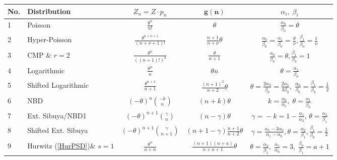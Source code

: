 \documentclass[a4paper,12pt]{amsart}
\newcommand{\ffrac}[2]{\ensuremath{\frac{\displaystyle #1}{\displaystyle #2}}}
\theoremstyle{definition}
\theoremstyle{remark}
\begin{document}
\renewcommand{\arraystretch}{1.5}
\setlength{}
\begin{table}[hbt] 
    \centering
    \begin{tabular}{|l|l|c|c|c|}
    \hline
    {\bf No.}  &  {\bf Distribution} & {{\boldmath $Z_n=Z\cdot p_n$}} & $\mathbf {g(n)}$ & {\boldmath $ {\alpha_i,\; \beta_i}$} \\
        \hline  \hline  
      1& Poisson &$\ffrac{\theta^n}{n!}$ & $\theta$ & $\ffrac{\alpha_0}{\beta_0}=\theta$  \\
       \hline \hline
       2& Hyper-Poisson \cite{JKK2005} &$\ffrac{\theta^{n+\nu+1}}{(n+\nu+1)!}$ & $ \ffrac{n+1}{n+\nu}\theta$  & $\ffrac{\alpha_0}{\beta_0}=\ffrac{\alpha_1}{\beta_0}=\ffrac{\theta}{\nu}, \ffrac{\beta_1}{\beta_0}=\ffrac{1}{\nu} $   \\
        \hline \hline
       3& CMP \cite{Shm2005} \;\& $r=2$ &$\ffrac{\theta^n}{((n+1)!)^2}$ & $ \ffrac{\theta}{n+1}$  & $\ffrac{\alpha_0}{\beta_0}=\theta, \ffrac{\beta_1}{\beta_0}=1 $   \\
        \hline \hline
       4& Logarithmic &$\ffrac{\theta^n}{n}$ & $\theta n$  & $\theta=\ffrac{\alpha_1}{\beta_0}$   \\
         \hline \hline
       5& Shifted Logarithmic &$\ffrac{\theta^{n+1}}{n+1}$ & $\ffrac{(n+1)^2}{n+2}\theta $  & $\theta\!=\!\ffrac{2\alpha_2}{\beta_0}\!=\!\ffrac{2\alpha_1}{3\beta_0},\; \ffrac{\alpha_0}{\beta_0}\!=\!\ffrac{\beta_1}{\beta_0}\!=\!\ffrac{1}{2}$   \\
         \hline \hline
    6&  NBD & $(-\theta )^n \binom{-k}{n}$ & $(n+k)\theta$ & $k=\ffrac{\alpha_0}{\alpha_1},\;\theta=\ffrac{\alpha_1}{\beta_0}$ \\
         \hline \hline
    7&    Ext. Sibuya/NBD1& $(-\theta )^{n+1} \binom{\gamma }{n}$ & $(n-\gamma)\theta$  & $\gamma\!=\!-k=1-\ffrac{\alpha_1}{\alpha_2}$,\; $\theta=\ffrac{\alpha_2}{\beta_1}$   \\ 
         \hline \hline
    8&    Shifted Ext. Sibuya & $(-\theta )^{n+1} \binom{\gamma }{n+1}$ & $(n\!+\!1\!-\!\gamma)\ffrac{n+1}{n+2}\theta$  & $\gamma\!=\!\ffrac{\alpha_1\!-\!3\alpha_0}{\alpha_1\!-\!\alpha_0}, \theta
        \!=\!\ffrac{\alpha_2}{\beta_1}, \ffrac{\beta_1}{\beta_0}\!=\!\frac{1}{2}$   \\ 
        \hline \hline
      9&  Hurwitz (\!\ref{HurPSD}\!)\;\&  $s\!=\!1$ & $\ffrac{\theta^n}{a\! +\!n}$ & $\ffrac{(n\!+\!1)(n+a)}{n+a+1} \theta $  & $\theta\!=\!\ffrac{\alpha_2}{\beta_1},\;\ffrac{\alpha_1}{\alpha_0}\!=\!3,\; \ffrac{\beta_0}{\beta_1}\!=\!a\!+\!1$   \\

\end{tabular}
\end{table}
\end{document}

